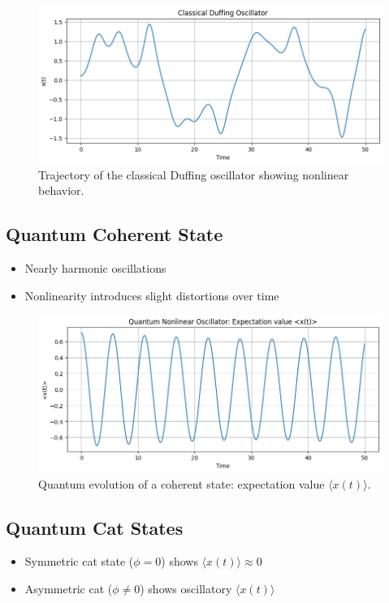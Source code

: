 \documentclass[conference]{IEEEtran}
\begin{document}
\begin{figure}[H]
    \centering
    \includegraphics[width=0.9\linewidth]{duffing.png}
    \caption{Trajectory of the classical Duffing oscillator showing nonlinear behavior.}
    \label{fig:duffing_classical}
\end{figure}

\subsection{Quantum Coherent State}
\begin{itemize}
    \item Nearly harmonic oscillations
    \item Nonlinearity introduces slight distortions over time
\end{itemize}

\begin{figure}[H]
    \centering
    \includegraphics[width=0.9\linewidth]{coh.png}
    \caption{Quantum evolution of a coherent state: expectation value $\langle x(t) \rangle$.}
    \label{fig:coherent_xt}
\end{figure}

\subsection{Quantum Cat States}
\begin{itemize}
    \item Symmetric cat state ($\phi=0$) shows $\langle x(t) \rangle \approx 0$
    \item Asymmetric cat ($\phi \neq 0$) shows oscillatory $\langle x(t) \rangle$
\end{itemize}
\end{document}
